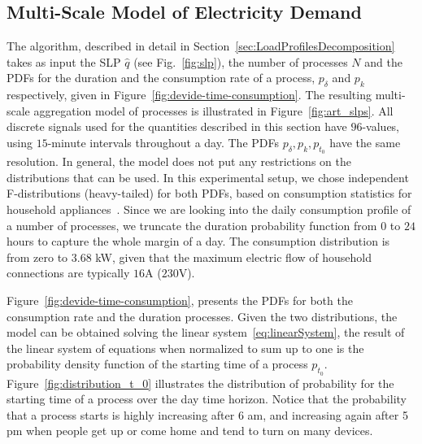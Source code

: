 \documentclass[conference]{IEEEtran}
\begin{document}
\subsection{Multi-Scale Model of Electricity Demand}
\label{sec:Results_Synthetic}

The algorithm, described in detail in Section~\ref{sec:LoadProfilesDecomposition} takes as input the SLP $\hat{q}$ (see Fig.~\ref{fig:slp}), the number of processes $N$ and the PDFs for the duration and the consumption rate of a process, $p_{\delta} $ and $p_k$ respectively, given in Figure~\ref{fig:devide-time-consumption}. The resulting multi-scale aggregation model of processes is illustrated in Figure~\ref{fig:art_slps}.
All discrete signals used for the quantities described in this section have $96$-values, using $15$-minute intervals throughout a day. The PDFs $p_{\delta}, p_k, p_{t_0}$ have the same resolution. In general, the model does not put any restrictions on the distributions that can be used. In this experimental setup, we chose independent F-distributions (heavy-tailed) for both PDFs, based on consumption statistics for household appliances~\cite{zimmermann2012household}.
Since we are looking into the daily consumption profile of a number of processes, we truncate the duration probability function from $0$ to $24$ hours to capture the whole margin of a day. The consumption distribution is from zero to $3.68$ kW, given that the maximum electric flow of household connections are typically $16$A ($230$V).

Figure~\ref{fig:devide-time-consumption}, presents the PDFs for both the consumption rate and the duration processes. Given the two distributions, the model can be obtained solving the linear system~\eqref{eq:linearSystem}, the result of the linear system of equations when normalized to sum up to one is the probability density function of the starting time of a process $p_{t_0}$. Figure~\ref{fig:distribution_t_0} illustrates the distribution of probability for the starting time of a process over the day time horizon. Notice that the probability that a process starts is highly increasing after 6 am, and increasing again after 5 pm when people get up or come home and tend to turn on many devices.
\end{document}
